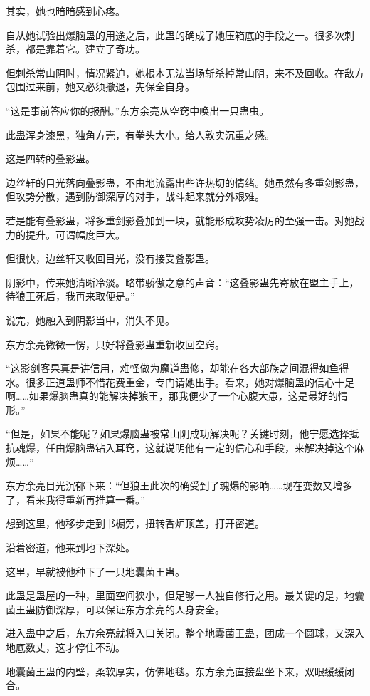 \begin{this_body}
其实，她也暗暗感到心疼。

自从她试验出爆脑蛊的用途之后，此蛊的确成了她压箱底的手段之一。很多次刺杀，都是靠着它。建立了奇功。

但刺杀常山阴时，情况紧迫，她根本无法当场斩杀掉常山阴，来不及回收。在敌方包围过来前，她又必须撤退，先保全自身。

“这是事前答应你的报酬。”东方余亮从空窍中唤出一只蛊虫。

此蛊浑身漆黑，独角方壳，有拳头大小。给人敦实沉重之感。

这是四转的叠影蛊。

边丝轩的目光落向叠影蛊，不由地流露出些许热切的情绪。她虽然有多重剑影蛊，但攻势分散，遇到防御深厚的对手，战斗起来就分外艰难。

若是能有叠影蛊，将多重剑影叠加到一块，就能形成攻势凌厉的至强一击。对她战力的提升。可谓幅度巨大。

但很快，边丝轩又收回目光，没有接受叠影蛊。

阴影中，传来她清晰冷淡。略带骄傲之意的声音：“这叠影蛊先寄放在盟主手上，待狼王死后，我再来取便是。”

说完，她融入到阴影当中，消失不见。

东方余亮微微一愣，只好将叠影蛊重新收回空窍。

“这影剑客果真是讲信用，难怪做为魔道蛊修，却能在各大部族之间混得如鱼得水。很多正道蛊师不惜花费重金，专门请她出手。看来，她对爆脑蛊的信心十足啊……如果爆脑蛊真的能解决掉狼王，那我便少了一个心腹大患，这是最好的情形。”

“但是，如果不能呢？如果爆脑蛊被常山阴成功解决呢？关键时刻，他宁愿选择抵抗魂爆，任由爆脑蛊钻入耳窍，这就说明他有一定的信心和手段，来解决掉这个麻烦……”

东方余亮目光沉郁下来：“但狼王此次的确受到了魂爆的影响……现在变数又增多了，看来我得重新再推算一番。”

想到这里，他移步走到书橱旁，扭转香炉顶盖，打开密道。

沿着密道，他来到地下深处。

这里，早就被他种下了一只地囊菌王蛊。

此蛊是蛊屋的一种，里面空间狭小，但足够一人独自修行之用。最关键的是，地囊菌王蛊防御深厚，可以保证东方余亮的人身安全。

进入蛊中之后，东方余亮就将入口关闭。整个地囊菌王蛊，团成一个圆球，又深入地底数丈，这才停住不动。

地囊菌王蛊的内壁，柔软厚实，仿佛地毯。东方余亮直接盘坐下来，双眼缓缓闭合。


\end{this_body}
